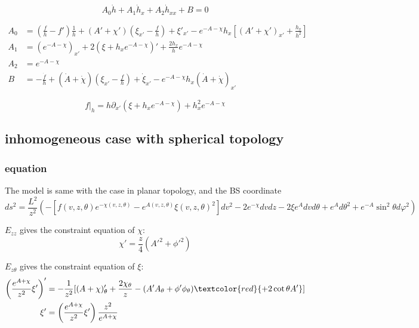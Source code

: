 \documentclass[12pt,a4paper]{ctexart}
\numberwithin{equation}{section}
\begin{document}
\begin{equation}
    A_0\dot{h}+A_1\dot{h}_x+A_2\dot{h}_{xx}+B=0
\end{equation}

\begin{equation}
    \begin{aligned}
        A_0&=(\frac{f}{h}-f')\frac{1}{h}+(A'+\chi')(\xi_{x'}-\frac{f}{h})+\xi'_{x'}-e^{-A-\chi}h_x[(A'+\chi')_{x'}+\frac{h_x}{h^{2}}]\\
        A_1&=(e^{-A-\chi})_{x'}+2(\xi+h_x e^{-A-\chi})'+\frac{2h_x}{h}e^{-A-\chi}\\
        A_2&=e^{-A-\chi}\\
        B&=-\frac{\dot{f}}{h}+(\dot{A}+\dot{\chi})(\xi_{x'}-\frac{f}{h})+\dot{\xi}_{x'}-e^{-A-\chi}h_x(\dot{A}+\dot{\chi})_{x'}
    \end{aligned}
\end{equation}

\begin{equation}
    f|_h=h\partial_{x'}(\xi+h_{x}e^{-A-\chi})+h_{x}^{2}e^{-A-\chi}
\end{equation}

\subsection{inhomogeneous case with spherical topology}

\subsubsection{equation}

The model is same with the case in planar topology, and the BS coordinate
\begin{equation}
    ds^2=\frac{L^2}{z^2}(-[f(v,z,\theta)e^{-\chi(v,z,\theta)}-e^{A(v,z,\theta)}\xi(v,z,\theta)^2]dv^2-2e^{-\chi}dvdz-2\xi e^Advd\theta+e^Ad\theta^2+e^{-A}\sin^2\theta d\varphi^2)
\end{equation}

$E_{zz}$ gives the constraint equation of $\chi$:
\begin{equation}
    \chi'=\frac{z}{4}(A'^2+\phi'^2)
\end{equation}

$E_{z\theta}$ gives the constraint equation of $\xi$:
\begin{equation}
    \begin{aligned}
        \left(\frac{e^{A+\chi}}{z^2}\xi'\right)'&=-\frac{1}{z^{2}}[(A+\chi)^{\prime}_{\theta}+\frac{2\chi_{\theta}}{z}-(A^{\prime}A_{\theta}+\phi'\phi_{\theta})\textcolor{red}{+2\cot\theta A'}]\\
        \xi'&=\left(\frac{e^{A+\chi}}{z^2}\xi'\right)\frac{z^2}{e^{A+\chi}}
    \end{aligned}
\end{equation}
\end{document}
